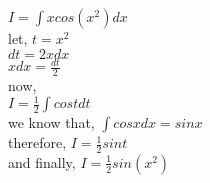 \documentclass{article}
\begin{document}
\Large{
$ I=\int {xcos(x^2)} d{x} $\\
let, $ t=x^2 $\\
$d{t}=2x d{x}$\\
$ xd{x}=\frac{d{t}}{2}$\\
now,\\
$I=\frac{1}{2} \int{cos{t}d{t}}$ \\
we know that, $ \int{cosx}d{x}=sinx$\\
therefore, $ I=\frac{1}{2} sint$\\
and finally, $I=\frac{1}{2} sin(x^2)$
}
\end{document}
